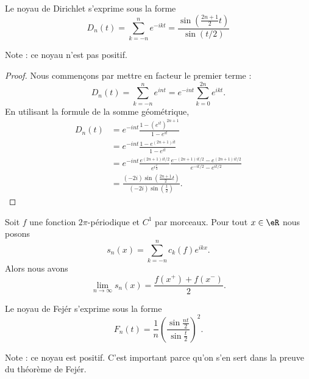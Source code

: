\begin{lemma}   \label{LemHPoIkwu}
    Le noyau de Dirichlet s'exprime sous la forme
    \begin{equation}
        D_n(t)=\sum_{k=-n}^n e^{-ikt}=\frac{ \sin\left( \frac{ 2n+1 }{ 2 }t \right) }{ \sin(t/2) }
    \end{equation}
\end{lemma}
Note : ce noyau n'est pas positif.

\begin{proof}
    Nous commençons par mettre en facteur le premier terme :
    \begin{equation}
        D_n(t)=\sum_{k=-n}^n e^{int}= e^{-int}\sum_{k=0}^{2n} e^{ikt}.
    \end{equation}
    En utilisant la formule de la somme géométrique,
    \begin{subequations}
        \begin{align}
            D_n(t)&= e^{-int}\frac{ 1-( e^{it})^{2n+1} }{ 1- e^{it} }\\
            &= e^{-int}\frac{ 1- e^{(2n+1)it} }{ 1- e^{it} }\\
            &= e^{-int}\frac{  e^{(2n+1)it/2} }{  e^{i\frac{ t }{ 2 }} }\frac{  e^{-(2n+1)it/2}- e^{(2n+1)it/2} }{  e^{-it/2}- e^{it/2} }\\
            &=\frac{ (-2i)\sin\left( \frac{ 2n+1 }{ 2 }t \right) }{ (-2i)\sin\left( \frac{ t }{2} \right) }.
        \end{align}
    \end{subequations}
\end{proof}

\begin{theorem}
    Soit \( f\) une fonction \( 2\pi\)-périodique et \( C^1\) par morceaux. Pour tout \( x\in \eR\) nous posons
    \begin{equation}
        s_n(x)=\sum_{k=-n}^nc_k(f) e^{ikx}.
    \end{equation}
    Alors nous avons
    \begin{equation}
        \lim_{n\to \infty} s_n(x)=\frac{ f(x^+)+f(x^-) }{ 2 }.
    \end{equation}
\end{theorem}


\begin{lemma}   \label{LemtCAjJz}
    Le noyau de Fejér s'exprime sous la forme
    \begin{equation}    \label{EqLOtzCf}
        F_n(t)=\frac{1}{ n }\left( \frac{ \sin\frac{ nt }{2} }{ \sin\frac{ t }{2} } \right)^2.
    \end{equation}
\end{lemma}
Note : ce noyau est positif. C'est important parce qu'on s'en sert dans la preuve du théorème de Fejér.

